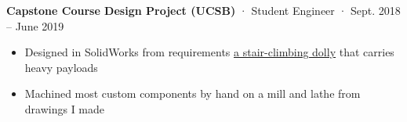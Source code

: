 \documentclass[12pt, oneside]{article}
\newcommand{\jobtitle}[3] {
	{\bf #1} · {#2} · {#3} \vspace{-7pt} \\
}
\begin{document}
\begin{flushleft}
\jobtitle{Capstone Course Design Project (UCSB)}{Student Engineer}{Sept. 2018 – June 2019}
\begin{itemize}
	\item Designed in SolidWorks from requirements \href{https://portfolium.com/entry/automatic-stair-climbing-vehicle}{a stair-climbing dolly} that carries heavy payloads \\
	\item Machined most custom components by hand on a mill and lathe from drawings I made \\
\end{itemize}





\end{flushleft}
\end{document}
